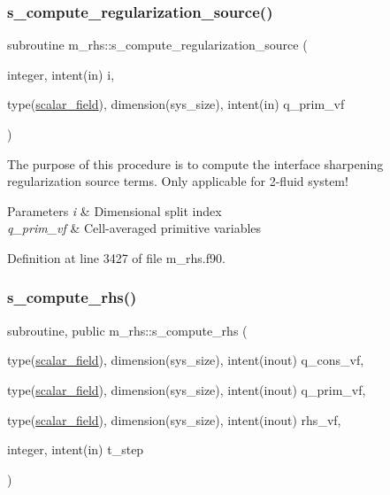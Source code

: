 \subsubsection{\texorpdfstring{s\+\_\+compute\+\_\+regularization\+\_\+source()}{s\_compute\_regularization\_source()}}
{\footnotesize\ttfamily subroutine m\+\_\+rhs\+::s\+\_\+compute\+\_\+regularization\+\_\+source (\begin{DoxyParamCaption}\item[{integer, intent(in)}]{i,  }\item[{type(\hyperlink{structm__derived__types_1_1scalar__field}{scalar\+\_\+field}), dimension(sys\+\_\+size), intent(in)}]{q\+\_\+prim\+\_\+vf }\end{DoxyParamCaption})}



The purpose of this procedure is to compute the interface sharpening regularization source terms. Only applicable for 2-\/fluid system! 


\begin{DoxyParams}{Parameters}
{\em i} & Dimensional split index \\
\hline
{\em q\+\_\+prim\+\_\+vf} & Cell-\/averaged primitive variables \\
\hline
\end{DoxyParams}


Definition at line 3427 of file m\+\_\+rhs.\+f90.

\mbox{\label{namespacem__rhs_a361f0038973069452cc88430c49bcfe8}} 
\subsubsection{\texorpdfstring{s\+\_\+compute\+\_\+rhs()}{s\_compute\_rhs()}}
{\footnotesize\ttfamily subroutine, public m\+\_\+rhs\+::s\+\_\+compute\+\_\+rhs (\begin{DoxyParamCaption}\item[{type(\hyperlink{structm__derived__types_1_1scalar__field}{scalar\+\_\+field}), dimension(sys\+\_\+size), intent(inout)}]{q\+\_\+cons\+\_\+vf,  }\item[{type(\hyperlink{structm__derived__types_1_1scalar__field}{scalar\+\_\+field}), dimension(sys\+\_\+size), intent(inout)}]{q\+\_\+prim\+\_\+vf,  }\item[{type(\hyperlink{structm__derived__types_1_1scalar__field}{scalar\+\_\+field}), dimension(sys\+\_\+size), intent(inout)}]{rhs\+\_\+vf,  }\item[{integer, intent(in)}]{t\+\_\+step }\end{DoxyParamCaption})}



